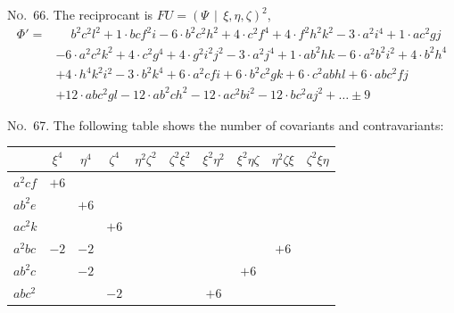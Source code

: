 \documentclass[11pt,a4paper]{book}
\begin{document}
\begin{center}
\noindent\textsc{No.~66.} The reciprocant is $FU = (\Psi\, \mid\, \xi, \eta, \zeta)^2$,
\begin{align*}
\Phi' = &\phantom{+} b^2c^2l^2 + 1\cdot bcf^2i - 6\cdot b^2c^2h^2 + 4\cdot c^2f^4 + 4\cdot f^2h^2k^2 - 3\cdot a^2i^4 + 1\cdot ac^2gj\\
& - 6\cdot a^2c^2k^2 + 4\cdot c^2g^4 + 4\cdot g^2i^2j^2 - 3\cdot a^2j^4 + 1\cdot ab^2hk - 6\cdot a^2b^2i^2 + 4\cdot b^2h^4\\
& + 4\cdot h^4k^2i^2 - 3\cdot b^2k^4 + 6\cdot a^2cfi + 6\cdot b^2c^2gk + 6\cdot c^2abhl + 6\cdot abc^2fj\\
& + 12\cdot abc^2gl - 12\cdot ab^2ch^2 - 12\cdot ac^2bi^2 - 12\cdot bc^2aj^2 + \ldots \pm 9
\end{align*}

\clearpage
\noindent\textsc{No.~67.} The following table shows the number of covariants and contravariants:
\begin{center}
\begin{tabular}{lccccccccc}
\toprule
& $\xi^4$ & $\eta^4$ & $\zeta^4$ & $\eta^2\zeta^2$ & $\zeta^2\xi^2$ & $\xi^2\eta^2$ & $\xi^2\eta\zeta$ & $\eta^2\zeta\xi$ & $\zeta^2\xi\eta$ \\
\midrule
$a^2cf$ & $+6$ & & & & & & & & \\
$ab^2e$ & & $+6$ & & & & & & & \\
$ac^2k$ & & & $+6$ & & & & & & \\
$a^2bc$ & $-2$ & $-2$ & & & & & & $+6$ & \\
$ab^2c$ & & $-2$ & & & & & $+6$ & & \\
$abc^2$ & & & $-2$ & & & $+6$ & & & \\
\bottomrule
\end{tabular}
\end{center}


\end{center}
\end{document}
